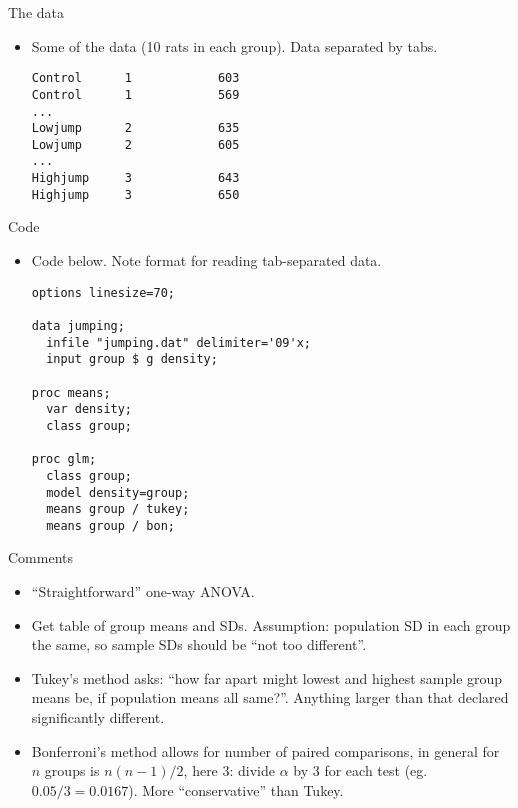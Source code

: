 \documentclass[pdf]{prosper}
\begin{document}
\begin{slide}{The data}

  \begin{itemize}
  \item Some of the data (10 rats in each group). Data separated by tabs.
\begin{verbatim}
Control      1            603
Control      1            569
...
Lowjump      2            635
Lowjump      2            605
...
Highjump     3            643
Highjump     3            650
\end{verbatim}
\end{itemize}
\end{slide}

\begin{slide}{Code}
\begin{itemize}
  \item Code below. Note format for reading tab-separated data.
\begin{verbatim}
options linesize=70;

data jumping;
  infile "jumping.dat" delimiter='09'x;
  input group $ g density;

proc means;
  var density;
  class group;

proc glm;
  class group;
  model density=group;
  means group / tukey;
  means group / bon;

\end{verbatim}


  \end{itemize}
  
\end{slide}

\begin{slide}{Comments}

  \begin{itemize}
  \item ``Straightforward'' one-way ANOVA.
  \item Get table of group means and SDs. Assumption: population SD in each group the same, so sample SDs should be ``not too different''.
  \item Tukey's method asks: ``how far apart might lowest and highest sample group means be, if population means all same?''. Anything larger than that declared significantly different.
  \item Bonferroni's method allows for number of paired comparisons, in general for $n$ groups is $n(n-1)/2$, here 3: divide $\alpha$ by 3 for each test (eg.\ $0.05/3=0.0167$). More ``conservative'' than Tukey.
  \end{itemize}
  
\end{slide}
\end{document}
